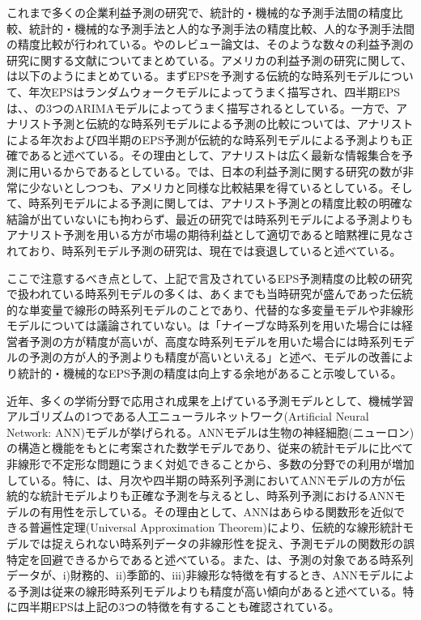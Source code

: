 \documentclass[a4paper, 12pt]{jsreport}
\begin{document}
これまで多くの企業利益予測の研究で、統計的・機械的な予測手法間の精度比較、統計的・機械的な予測手法と人的な予測手法の精度比較、人的な予測手法間の精度比較が行われている。\cite{sakurai1990}や\cite{ota2006}のレビュー論文は、そのような数々の利益予測の研究に関する文献についてまとめている。アメリカの利益予測の研究に関して、\cite{sakurai1990}は以下のようにまとめている。まずEPSを予測する伝統的な時系列モデルについて、年次EPSはランダムウォークモデルによってうまく描写され、四半期EPSは\cite*{brown1979univariate}、\cite{griffin1977time}、\cite{foster1977quarterly}の3つのARIMAモデルによってうまく描写されるとしている。一方で、アナリスト予測と伝統的な時系列モデルによる予測の比較については、アナリストによる年次および四半期のEPS予測が伝統的な時系列モデルによる予測よりも正確であると述べている。その理由として、アナリストは広く最新な情報集合を予測に用いるからであるとしている。\cite{ota2006}では、日本の利益予測に関する研究の数が非常に少ないとしつつも、アメリカと同様な比較結果を得ているとしている。そして、時系列モデルによる予測に関しては、アナリスト予測との精度比較の明確な結論が出ていないにも拘わらず、最近の研究では時系列モデルによる予測よりもアナリスト予測を用いる方が市場の期待利益として適切であると暗黙裡に見なされており、時系列モデル予測の研究は、現在では衰退していると述べている。

ここで注意するべき点として、上記で言及されているEPS予測精度の比較の研究で扱われている時系列モデルの多くは、あくまでも当時研究が盛んであった伝統的な単変量で線形の時系列モデルのことであり、代替的な多変量モデルや非線形モデルについては議論されていない。\cite{ota2006}は「ナイーブな時系列を用いた場合には経営者予測の方が精度が高いが、高度な時系列モデルを用いた場合には時系列モデルの予測の方が人的予測よりも精度が高いといえる」と述べ、モデルの改善により統計的・機械的なEPS予測の精度は向上する余地があること示唆している。

近年、多くの学術分野で応用され成果を上げている予測モデルとして、機械学習アルゴリズムの1つである人工ニューラルネットワーク(Artificial Neural Network: ANN)モデルが挙げられる。ANNモデルは生物の神経細胞(ニューロン)の構造と機能をもとに考案された数学モデルであり、従来の統計モデルに比べて非線形で不定形な問題にうまく対処できることから、多数の分野での利用が増加している\citep*{tkavc2016artificial}。特に、\cite{hill1996neural}は、月次や四半期の時系列予測においてANNモデルの方が伝統的な統計モデルよりも正確な予測を与えるとし、時系列予測におけるANNモデルの有用性を示している。その理由として、ANNはあらゆる関数形を近似できる普遍性定理(Universal Approximation Theorem)\citep{hornik1989multilayer}により、伝統的な線形統計モデルでは捉えられない時系列データの非線形性を捉え、予測モデルの関数形の誤特定を回避できるからであると述べている。また、\cite{hill1994artificial}は、予測の対象である時系列データが、i)財務的、ii)季節的、iii)非線形な特徴を有するとき、ANNモデルによる予測は従来の線形時系列モデルよりも精度が高い傾向があると述べている。特に四半期EPSは上記の3つの特徴を有することも確認されている\citep*{hopwood1986univariate}。
\end{document}
